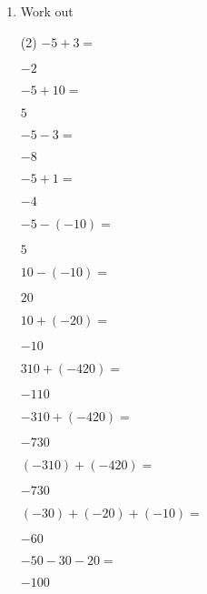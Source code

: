 \clearpage    
\begin{enumerate} [leftmargin=0cm]

\item Work out
\begin{tasks}[label=(\alph*), after-item-skip=2pt,after-skip=3pt, label-width=4ex](2)
    \task  $ -5+3=$                           \begin{envFillIn}$  -2     $    \end{envFillIn}
    \task  $ -5+10=$                          \begin{envFillIn}$   5     $    \end{envFillIn}
    \task  $ -5-3=$                           \begin{envFillIn}$  -8     $    \end{envFillIn}
    \task  $ -5+1=$                           \begin{envFillIn}$  -4     $    \end{envFillIn}
    \task  $ -5-(-10)=$                       \begin{envFillIn}$   5     $    \end{envFillIn}
    \task  $ 10-(-10)=$                       \begin{envFillIn}$  20     $    \end{envFillIn}
    \task  $ 10+(-20)=$                       \begin{envFillIn}$ -10     $    \end{envFillIn}
    \task  $ 310+(-420)=$                     \begin{envFillIn}$ -110    $    \end{envFillIn}
    \task  $ -310+(-420)=$                    \begin{envFillIn}$ -730    $    \end{envFillIn}
    \task  $ (-310)+(-420)=$                  \begin{envFillIn}$ -730    $    \end{envFillIn}
    \task  $ (-30)+(-20)+(-10)=$              \begin{envFillIn}$ -60     $    \end{envFillIn}    
    \task  $ -50-30-20=$                      \begin{envFillIn}$ -100    $    \end{envFillIn}    
\end{tasks}


\end{enumerate}
